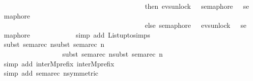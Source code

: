 \begin{isabellebody}
\ \ \ \ \ \ \ \ \ \ \ \ \ \ \ \ \ \ \ \ \ \ \ \ \ \ \ \ \ \ \ \ \ \ \ \ \ \ \ \ \ then\ evs{\isachardot}{\kern0pt}unlock\ {}\ {\isasymrightarrow}\ semaphore\ {}\ {\isacharbar}{\kern0pt}{\isacharbar}{\kern0pt}{\isacharbar}{\kern0pt}\ semaphore\ {}\isanewline
\ \ \ \ \ \ \ \ \ \ \ \ \ \ \ \ \ \ \ \ \ \ \ \ \ \ \ \ \ \ \ \ \ \ \ \ \ \ \ \ \ else\ semaphore\ {}\ {\isacharbar}{\kern0pt}{\isacharbar}{\kern0pt}{\isacharbar}{\kern0pt}\ evs{\isachardot}{\kern0pt}unlock\ {}\ {\isasymrightarrow}\ semaphore\ {}{\isacharparenright}{\kern0pt}{\isacharparenright}{\kern0pt}{\isacharparenright}{\kern0pt}{\isachardoublequoteclose}\isanewline
\ \ \ \ \ \ \ \ \ \ \ \isamarkupfalse%
{\isacharparenleft}{\kern0pt}simp\ add{\isacharcolon}{\kern0pt}\ List{\isachardot}{\kern0pt}upto{\isachardot}{\kern0pt}simps{\isacharparenright}{\kern0pt}\isanewline
\ \ \ \ \ \ \ \ \ \ \ \isamarkupfalse%
{\isacharparenleft}{\kern0pt}subst\ sema{\isacharunderscore}{\kern0pt}rec{\isacharbrackleft}{\kern0pt}\ n{\isacharequal}{\kern0pt}{\isacartoucheopen}{}{\isacartoucheclose}{\isacharbrackright}{\kern0pt}{\isacharcomma}{\kern0pt}subst\ sema{\isacharunderscore}{\kern0pt}rec{\isacharbrackleft}{\kern0pt}\ n{\isacharequal}{\kern0pt}{\isacartoucheopen}{}{\isacartoucheclose}{\isacharbrackright}{\kern0pt}{\isacharcomma}{\kern0pt}\isanewline
\ \ \ \ \ \ \ \ \ \ \ \ \ \ \ \ \ subst\ sema{\isacharunderscore}{\kern0pt}rec{\isacharbrackleft}{\kern0pt}\ n{\isacharequal}{\kern0pt}{\isacartoucheopen}{}{\isacartoucheclose}{\isacharbrackright}{\kern0pt}{\isacharcomma}{\kern0pt}subst\ sema{\isacharunderscore}{\kern0pt}rec{\isacharbrackleft}{\kern0pt}\ n{\isacharequal}{\kern0pt}{\isacartoucheopen}{}{\isacartoucheclose}{\isacharbrackright}{\kern0pt}{\isacharparenright}{\kern0pt}\ \isanewline
\ \ \ \ \ \ \ \ \ \ \ \isamarkupfalse%
{\isacharparenleft}{\kern0pt}simp\ add{\isacharcolon}{\kern0pt}\ inter{}Mprefix{}\ inter{}Mprefix{}{\isacharparenright}{\kern0pt}\isanewline
\ \ \ \ \ \ \ \ \ \ \ \isamarkupfalse%
{\isacharparenleft}{\kern0pt}simp\ add{\isacharcolon}{\kern0pt}\ sema{\isacharunderscore}{\kern0pt}rec{\isacharbrackleft}{\kern0pt}\ n{\isacharequal}{\kern0pt}{\isacartoucheopen}{}{\isacartoucheclose}{\isacharcomma}{\kern0pt}symmetric{\isacharbrackright}{\kern0pt}\ \isanewline

\end{isabellebody}
